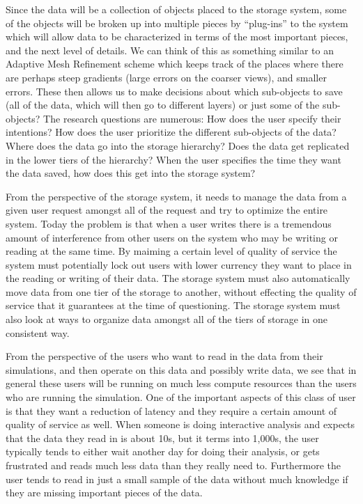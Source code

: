 Since the data will be a collection of objects placed to the storage system,
some of the objects will be broken up into multiple pieces by ``plug-ins''
to the system which will allow data to be characterized in terms of the most
important pieces, and the next level of details. We can think of this as
something similar to an Adaptive Mesh Refinement scheme which keeps track of
the places where there are perhaps steep gradients (large errors on the
coarser views), and smaller errors. These then allows us to make decisions
about which sub-objects to save (all of the data, which will then go to
different layers) or just some of the sub-objects? The research questions
are numerous: How does the user specify their intentions? How does the user
prioritize the different sub-objects of the data? Where does the data go
into the storage hierarchy? Does the data get replicated in the lower tiers
of the hierarchy? When the user specifies the time they want the data saved,
how does this get into the storage system?

From the perspective of the storage system, it needs to manage the data from
a given user request amongst all of the request and try to optimize the
entire system. Today the problem is that when a user writes there is a
tremendous amount of interference from other users on the system who may be
writing or reading at the same time. By maiming a certain level of quality
of service the system must potentially lock out users with lower currency
they want to place in the reading or writing of their data. The storage
system must also automatically move data from one tier of the storage to
another, without effecting the quality of service that it guarantees at the
time of questioning. The storage system must also look at ways to organize
data amongst all of the tiers of storage in one consistent way.

From the perspective of the users who want to read in the data from their
simulations, and then operate on this data and possibly write data, we see
that in general these users will be running on much less compute resources
than the users who are running the simulation. One of the important aspects
of this class of user is that they want a reduction of latency and they
require a certain amount of quality of service as well. When someone is
doing interactive analysis and expects that the data they read in is about
10s, but it terms into 1,000s, the user typically tends to either wait
another day for doing their analysis, or gets frustrated and reads much less
data than they really need to. Furthermore the user tends to read in just a
small sample of the data without much knowledge if they are missing
important pieces of the data.

